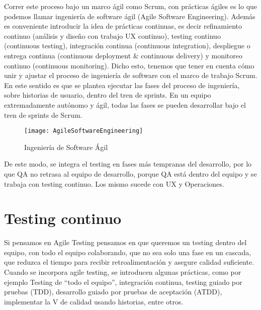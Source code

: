 Correr este proceso bajo un marco ágil como Scrum, con prácticas ágiles es lo que podemos llamar ingeniería de software ágil (Agile Software Engineering). Además es conveniente introducir la idea de prácticas continuas, es decir refinamiento continuo (análisis y diseño con trabajo UX continuo), testing continuo (continuous testing), integración continua (continuous integration), despliegue o entrega continua (continuous deployment \& continuous delivery) y monitoreo continuo (continuous monitoring). 
Dicho esto, tenemos que tener en cuenta cómo unir y ajustar el proceso de ingeniería de software con el marco de trabajo Scrum. En este sentido es que se plantea ejecutar las fases del proceso de ingeniería, sobre historias de usuario, dentro del tren de sprints. En un equipo extremadamente autónomo y ágil, todas las fases se pueden desarrollar bajo el tren de sprints de Scrum.

\begin{figure}[h]
  \centering
  \texttt{[image: AgileSoftwareEngineering]}
  \caption{Ingeniería de Software Ágil}
  \centering
  \label{fig:AgileSoftwareEngineering} %
\end{figure}
\FloatBarrier %

De este modo, se integra el testing en fases más tempranas del desarrollo, por lo que QA no retrasa al equipo de desarrollo, porque QA está dentro del equipo y se trabaja con testing continuo. Los mismo sucede con UX y Operaciones.

\section{Testing continuo}

Si pensamos en Agile Testing pensamos en que queremos un testing dentro del equipo, con todo el equipo colaborando, que no sea solo una fase en un cascada, que reduzca el tiempo para recibir retroalimentación y asegure calidad suficiente. Cuando se incorpora agile testing, se introducen algunas prácticas, como por ejemplo Testing de “todo el equipo”, integración continua, testing guiado por pruebas (TDD), desarrollo guiado por pruebas de aceptación (ATDD), implementar la V de calidad usando historias, entre otros. 


